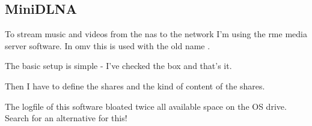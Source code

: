 

\subsection{MiniDLNA}\label{subsec:MiniDLNA}

To stream music and videos from the \gls{nas} to the network I'm using the
\gls{rme} media server software. In \gls{omv} this is used with the old name
.


The basic setup is simple - I've checked the  box and that's
it.


Then I have to define the shares and the kind of content of the shares.


 The logfile of this software bloated twice all
available space on the OS drive. Search for an alternative for this!
